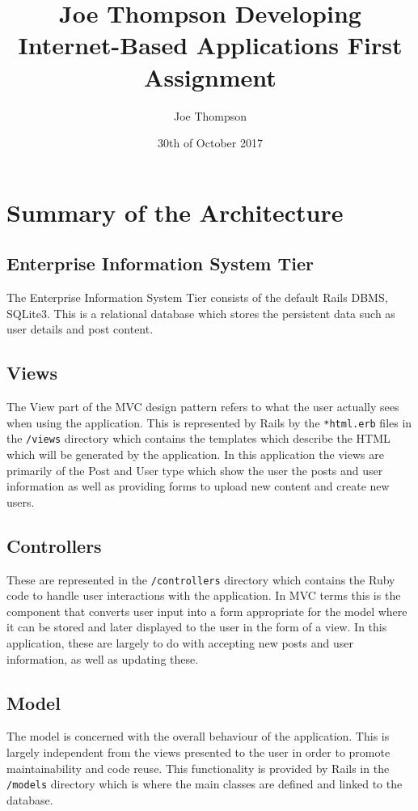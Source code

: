 \documentclass[12pt, a4paper]{article}
\begin{document}
\title{\textbf{Joe Thompson Developing Internet-Based Applications First Assignment}}
\author{Joe Thompson}
\date{30th of October 2017}
\maketitle

\section{Summary of the Architecture}
\subsection{Enterprise Information System Tier}
The Enterprise Information System Tier consists of the default Rails DBMS, SQLite3. This is a relational database which stores the persistent data such as user details and post content.

\subsection{Views}
The View part of the MVC design pattern refers to what the user actually sees when using the application. This is represented by Rails by the \texttt{*html.erb} files in the \texttt{/views} directory which contains the templates which describe the HTML which will be generated by the application. In this application the views are primarily of the Post and User type which show the user the posts and user information as well as providing forms to upload new content and create new users.
\subsection{Controllers}
These are represented in the \texttt{/controllers} directory which contains the Ruby code to handle user interactions with the application. In MVC terms this is the component that converts user input into a form appropriate for the model where it can be stored and later displayed to the user in the form of a view. In this application, these are largely to do with accepting new posts and user information, as well as updating these.

\subsection{Model}
The model is concerned with the overall behaviour of the application. This is largely independent from the views presented to the user in order to promote maintainability and code reuse. This functionality is provided by Rails in the \texttt{/models} directory which is where the main classes are defined and linked to the database.
\end{document}
